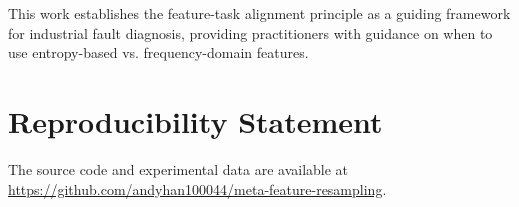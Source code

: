 \documentclass[11pt]{article}
\begin{document}
This work establishes the feature-task alignment principle as a guiding framework for industrial fault diagnosis, providing practitioners with guidance on when to use entropy-based vs. frequency-domain features.

\section*{Reproducibility Statement}
The source code and experimental data are available at \url{https://github.com/andyhan100044/meta-feature-resampling}.



\end{document}
